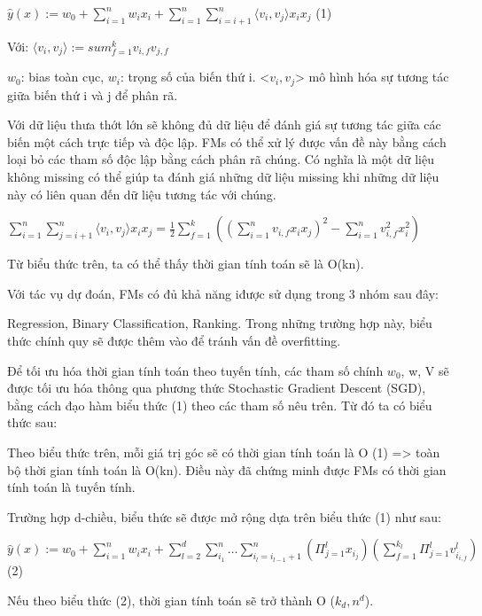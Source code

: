 \documentclass[a4paper,12pt,numbered,print,index,custombib, oneside, custommargin]{report}
\newcommand\tab[1][1cm]{\hspace*{#1}}
\begin{document}
\tab $\hat{y}(x) := w_0 + \sum_{i=1}^{n}w_ix_i + \sum_{i=1}^{n}\sum_{i=i+1}^{n}\langle v_i,v_j \rangle x_i x_j$		(1)\par
Với: \tab $\langle v_i,v_j \rangle := sum_{f=1}^{k} v_{i,f} v_{j,f}$ \par 
$w_0$:  bias toàn cục, $w_i$: trọng số của biến thứ i. <$v_i, v_j$> mô hình hóa sự tương tác giữa biến thứ i và j để phân rã. \par
Với dữ liệu thưa thớt lớn sẽ không đủ dữ liệu để đánh giá sự tương tác giữa các biến một cách trực tiếp và độc lập. FMs có thể xử lý được vấn đề này bằng cách loại bỏ các tham số độc lập bằng cách phân rã chúng. Có nghĩa là một dữ liệu không missing có thể giúp ta đánh giá những dữ liệu missing khi những dữ liệu này có liên quan đến dữ liệu tương tác với chúng. \par

\tab $\sum_{i=1}^{n}\sum_{j=i+1}^{n}\langle v_i,v_j \rangle x_i x_j = \frac{1}{2}\sum_{f=1}^{k}((\sum_{i=1}^{n}v_{i,f}x_i x_j)^2 - \sum_{i=1}^{n}v_{i,f}^2 x_i^2)$ \par

Từ biểu thức trên, ta có thể thấy thời gian tính toán sẽ là O(kn). \par
Với tác vụ dự đoán, FMs có đủ khả năng iđược sử dụng trong 3 nhóm sau đây: \par Regression, Binary Classification, Ranking. Trong những trường hợp này, biểu thức chính quy sẽ được thêm vào để tránh vấn đề overfitting. \par
Để tối ưu hóa thời gian tính toán theo tuyến tính, các tham số chính $w_0$, w, V sẽ được tối ưu hóa thông qua phương thức Stochastic Gradient Descent (SGD), bằng cách đạo hàm biểu thức (1) theo các tham số nêu trên. Từ đó ta có biểu thức sau: \par


Theo biểu thức trên, mỗi giá trị góc sẽ có thời gian tính toán là O (1) => toàn bộ thời gian tính toán là O(kn). Điều này đã chứng minh được FMs có thời gian tính toán là tuyến tính.	\par
Trường hợp d-chiều, biểu thức sẽ được mở rộng dựa trên biểu thức (1) như sau: \par
\tab $\hat{y}(x) := w_0 + \sum_{i=1}^{n}w_i x_i + \sum_{l=2}^{d}\sum_{i_1}^{n}\ldots\sum_{i_l=i_{l-1}+1}^{n}(\Pi_{j=1}^{l}x_{i_j})(\sum_{f=1}^{k_l}\Pi_{j=1}^{l}v_{i_{i,f}}^l)$ \tab (2)\par 
Nếu theo biểu thức (2), thời gian tính toán sẽ trở thành O ($k_d, n^d$).
\end{document}
